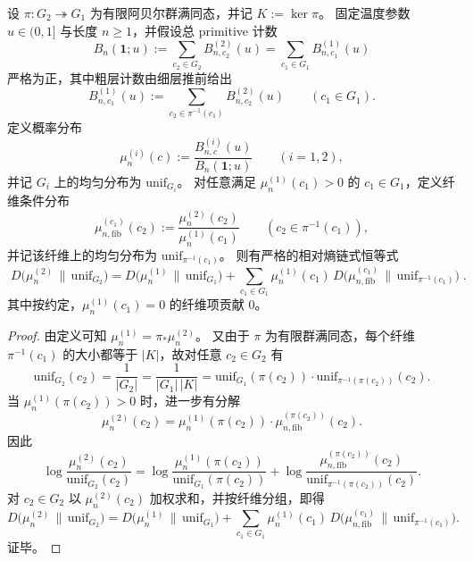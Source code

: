 \begin{theorem}\label{thm:kernel-chebotarev-quotient-relative-entropy-chain}
设 \(\pi:G_2\twoheadrightarrow G_1\) 为有限阿贝尔群满同态，并记 \(K:=\ker\pi\)。
固定温度参数 \(u\in(0,1]\) 与长度 \(n\ge 1\)，并假设总 primitive 计数
\[
B_n(\mathbf{1};u):=
\sum_{c_2\in G_2}B^{(2)}_{n,c_2}(u)
=
\sum_{c_1\in G_1}B^{(1)}_{n,c_1}(u)
\]
严格为正，其中粗层计数由细层推前给出
\[
B^{(1)}_{n,c_1}(u):=
\sum_{c_2\in\pi^{-1}(c_1)}B^{(2)}_{n,c_2}(u)
\qquad(c_1\in G_1).
\]
定义概率分布
\[
\mu_n^{(i)}(c):=\frac{B^{(i)}_{n,c}(u)}{B_n(\mathbf{1};u)}
\qquad(i=1,2),
\]
并记 \(G_i\) 上的均匀分布为 \(\mathrm{unif}_{G_i}\)。
对任意满足 \(\mu_n^{(1)}(c_1)>0\) 的 \(c_1\in G_1\)，定义纤维条件分布
\[
\mu_{n,\mathrm{fib}}^{(c_1)}(c_2):=
\frac{\mu_n^{(2)}(c_2)}{\mu_n^{(1)}(c_1)}
\qquad(c_2\in\pi^{-1}(c_1)),
\]
并记该纤维上的均匀分布为 \(\mathrm{unif}_{\pi^{-1}(c_1)}\)。
则有严格的相对熵链式恒等式
\[
\boxed{\;
D\!\bigl(\mu_n^{(2)}\,\|\,\mathrm{unif}_{G_2}\bigr)
=
D\!\bigl(\mu_n^{(1)}\,\|\,\mathrm{unif}_{G_1}\bigr)
+
\sum_{c_1\in G_1}\mu_n^{(1)}(c_1)\,
D\!\bigl(\mu_{n,\mathrm{fib}}^{(c_1)}\,\|\,\mathrm{unif}_{\pi^{-1}(c_1)}\bigr)\; }.
\]
其中按约定，\(\mu_n^{(1)}(c_1)=0\) 的纤维项贡献 \(0\)。
\end{theorem}

\begin{proof}
由定义可知 \(\mu_n^{(1)}=\pi_\ast\mu_n^{(2)}\)。
又由于 \(\pi\) 为有限群满同态，每个纤维 \(\pi^{-1}(c_1)\) 的大小都等于 \(|K|\)，故对任意 \(c_2\in G_2\) 有
\[
\mathrm{unif}_{G_2}(c_2)
=
\frac{1}{|G_2|}
=
\frac{1}{|G_1|\,|K|}
=
\mathrm{unif}_{G_1}(\pi(c_2))\cdot \mathrm{unif}_{\pi^{-1}(\pi(c_2))}(c_2).
\]
当 \(\mu_n^{(1)}(\pi(c_2))>0\) 时，进一步有分解
\[
\mu_n^{(2)}(c_2)
=
\mu_n^{(1)}(\pi(c_2))\cdot
\mu_{n,\mathrm{fib}}^{(\pi(c_2))}(c_2).
\]
因此
\[
\log\frac{\mu_n^{(2)}(c_2)}{\mathrm{unif}_{G_2}(c_2)}
=
\log\frac{\mu_n^{(1)}(\pi(c_2))}{\mathrm{unif}_{G_1}(\pi(c_2))}
+
\log\frac{\mu_{n,\mathrm{fib}}^{(\pi(c_2))}(c_2)}{\mathrm{unif}_{\pi^{-1}(\pi(c_2))}(c_2)}.
\]
对 \(c_2\in G_2\) 以 \(\mu_n^{(2)}(c_2)\) 加权求和，并按纤维分组，即得
\[
D\!\bigl(\mu_n^{(2)}\,\|\,\mathrm{unif}_{G_2}\bigr)
=
D\!\bigl(\mu_n^{(1)}\,\|\,\mathrm{unif}_{G_1}\bigr)
+
\sum_{c_1\in G_1}\mu_n^{(1)}(c_1)\,
D\!\bigl(\mu_{n,\mathrm{fib}}^{(c_1)}\,\|\,\mathrm{unif}_{\pi^{-1}(c_1)}\bigr).
\]
证毕。
\end{proof}

